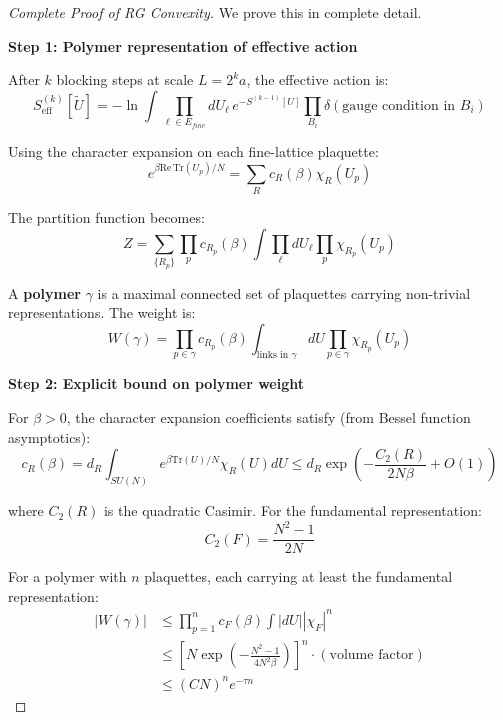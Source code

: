 \begin{proof}[Complete Proof of RG Convexity]
We prove this in complete detail.

\textbf{Step 1: Polymer representation of effective action}

After $k$ blocking steps at scale $L = 2^k a$, the effective action is:
\begin{equation}
S_{\text{eff}}^{(k)}[\widetilde{U}] = -\ln \int \prod_{\ell \in E_{fine}} dU_\ell \, e^{-S^{(k-1)}[U]} \prod_{B_i} \delta(\text{gauge condition in } B_i)
\end{equation}

Using the character expansion on each fine-lattice plaquette:
\begin{equation}
e^{\beta \mathrm{Re}\,\mathrm{Tr}(U_p)/N} = \sum_{R} c_R(\beta) \chi_R(U_p)
\end{equation}

The partition function becomes:
\begin{equation}
Z = \sum_{\{R_p\}} \prod_p c_{R_p}(\beta) \int \prod_\ell dU_\ell \prod_p \chi_{R_p}(U_p)
\end{equation}

A \textbf{polymer} $\gamma$ is a maximal connected set of plaquettes carrying non-trivial representations. The weight is:
\begin{equation}
W(\gamma) = \prod_{p \in \gamma} c_{R_p}(\beta) \int_{\text{links in }\gamma} dU \prod_{p \in \gamma} \chi_{R_p}(U_p)
\end{equation}

\textbf{Step 2: Explicit bound on polymer weight}

For $\beta > 0$, the character expansion coefficients satisfy (from Bessel function asymptotics):
\begin{equation}
c_R(\beta) = d_R \int_{SU(N)} e^{\beta \mathrm{Tr}(U)/N} \chi_R(U) dU \le d_R \exp\left( -\frac{C_2(R)}{2N\beta} + O(1) \right)
\end{equation}

where $C_2(R)$ is the quadratic Casimir. For the fundamental representation:
\begin{equation}
C_2(F) = \frac{N^2-1}{2N}
\end{equation}

For a polymer with $n$ plaquettes, each carrying at least the fundamental representation:
\begin{align}
|W(\gamma)| &\le \prod_{p=1}^n c_F(\beta) \int |dU| |\chi_F|^n \\
&\le \left[ N \exp\left( -\frac{N^2-1}{4N^2\beta} \right) \right]^n \cdot (\text{volume factor}) \\
&\le (CN)^n e^{-\tau n}
\end{align}


\end{proof}

